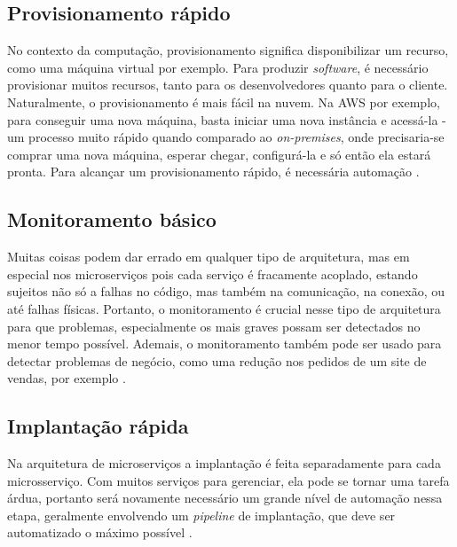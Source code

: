 
\subsection{Provisionamento rápido}\label{boas-praticas-provisionamento-rapido}

No contexto da computação, provisionamento significa disponibilizar um recurso, como uma máquina virtual por exemplo. Para produzir \emph{software}, é necessário provisionar muitos recursos, tanto para os desenvolvedores quanto para o cliente. Naturalmente, o provisionamento é mais fácil na nuvem. Na AWS por exemplo, para conseguir uma nova máquina, basta iniciar uma nova instância e acessá-la - um processo muito rápido quando comparado ao \emph{on-premises}, onde precisaria-se comprar uma nova máquina, esperar chegar, configurá-la e só então ela estará pronta. Para alcançar um provisionamento rápido, é necessária automação \cite{martin-fowler-microservice-prereq}.

\subsection{Monitoramento básico}\label{boas-praticas-monitoramento-basico}

Muitas coisas podem dar errado em qualquer tipo de arquitetura, mas em especial nos microserviços pois cada serviço é fracamente acoplado, estando sujeitos não só a falhas no código, mas também na comunicação, na conexão, ou até falhas físicas. Portanto, o monitoramento é crucial nesse tipo de arquitetura para que problemas, especialmente os mais graves possam ser detectados no menor tempo possível. Ademais, o monitoramento também pode ser usado para detectar problemas de negócio, como uma redução nos pedidos de um site de vendas, por exemplo \cite{martin-fowler-microservice-prereq}.

\subsection{Implantação rápida}\label{boas-praticas-implantacao-rapida}

Na arquitetura de microserviços a implantação é feita separadamente para cada microsserviço. Com muitos serviços para gerenciar, ela pode se tornar uma tarefa árdua, portanto será novamente necessário um grande nível de automação nessa etapa, geralmente envolvendo um \emph{pipeline} de implantação, que deve ser automatizado o máximo possível \cite{martin-fowler-microservice-prereq}.

